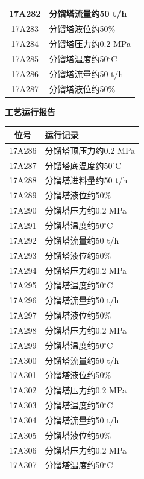 \documentclass[UTF8,10pt,a4paper,fontset=fandol]{ctexart}
\begin{document}
\begin{center}
\begin{minipage}[t]{0.47\textwidth}
\begin{tabularx}{\linewidth}{|c|>{\RaggedRight\arraybackslash}X|}
17A282 & 分馏塔流量约50 t/h \\ \hline
17A283 & 分馏塔液位约50\% \\ \hline
17A284 & 分馏塔压力约0.2 MPa \\ \hline
17A285 & 分馏塔温度约50$^\circ$C \\ \hline
17A286 & 分馏塔流量约50 t/h \\ \hline
17A287 & 分馏塔液位约50\% \\ \hline
\end{tabularx}
\end{minipage}
\hfill
\begin{minipage}[t]{0.47\textwidth}
\centering
\textbf{工艺运行报告}

\begin{tabularx}{\linewidth}{|c|>{\RaggedRight\arraybackslash}X|}
\hline
\textbf{位号} & \textbf{运行记录} \\ \hline
17A286 & 分馏塔顶压力约0.2 MPa \\ \hline
17A287 & 分馏塔底温度约50$^\circ$C \\ \hline
17A288 & 分馏塔进料量约50 t/h \\ \hline
17A289 & 分馏塔液位约50\% \\ \hline
17A290 & 分馏塔压力约0.2 MPa \\ \hline
17A291 & 分馏塔温度约50$^\circ$C \\ \hline
17A292 & 分馏塔流量约50 t/h \\ \hline
17A293 & 分馏塔液位约50\% \\ \hline
17A294 & 分馏塔压力约0.2 MPa \\ \hline
17A295 & 分馏塔温度约50$^\circ$C \\ \hline
17A296 & 分馏塔流量约50 t/h \\ \hline
17A297 & 分馏塔液位约50\% \\ \hline
17A298 & 分馏塔压力约0.2 MPa \\ \hline
17A299 & 分馏塔温度约50$^\circ$C \\ \hline
17A300 & 分馏塔流量约50 t/h \\ \hline
17A301 & 分馏塔液位约50\% \\ \hline
17A302 & 分馏塔压力约0.2 MPa \\ \hline
17A303 & 分馏塔温度约50$^\circ$C \\ \hline
17A304 & 分馏塔流量约50 t/h \\ \hline
17A305 & 分馏塔液位约50\% \\ \hline
17A306 & 分馏塔压力约0.2 MPa \\ \hline
17A307 & 分馏塔温度约50$^\circ$C \\ \hline

\end{tabularx}
\end{minipage}
\end{center}
\end{document}
